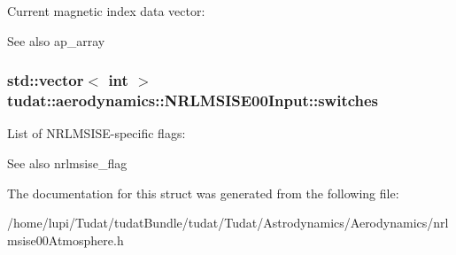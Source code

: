 Current magnetic index data vector\+: 

\begin{DoxySeeAlso}{See also}
ap\+\_\+array 
\end{DoxySeeAlso}
\subsubsection[{\texorpdfstring{switches}{switches}}]{\setlength{\rightskip}{0pt plus 5cm}std\+::vector$<$ int $>$ tudat\+::aerodynamics\+::\+N\+R\+L\+M\+S\+I\+S\+E00\+Input\+::switches}\hypertarget{structtudat_1_1aerodynamics_1_1NRLMSISE00Input_a90237ee7bf069c7a1bf5d0135bd8638d}{}\label{structtudat_1_1aerodynamics_1_1NRLMSISE00Input_a90237ee7bf069c7a1bf5d0135bd8638d}


List of N\+R\+L\+M\+S\+I\+S\+E-\/specific flags\+: 

\begin{DoxySeeAlso}{See also}
nrlmsise\+\_\+flag 
\end{DoxySeeAlso}


The documentation for this struct was generated from the following file\+:\begin{DoxyCompactItemize}
\item 
/home/lupi/\+Tudat/tudat\+Bundle/tudat/\+Tudat/\+Astrodynamics/\+Aerodynamics/nrlmsise00\+Atmosphere.\+h\end{DoxyCompactItemize}
